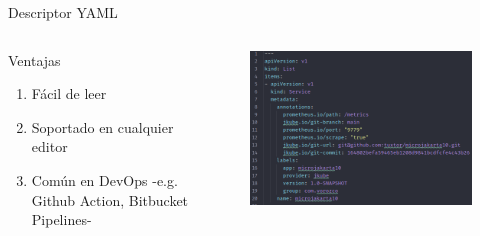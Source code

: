 \documentclass[aspectratio=169]{beamer}
\begin{document}
\begin{frame}{Descriptor YAML}
	\begin{columns}[T] %
		
		\begin{column}[T]{4cm} %
        Ventajas
		\begin{enumerate}
			\item Fácil de leer
			\item Soportado en cualquier editor
            \item Común en DevOps -e.g. Github Action, Bitbucket Pipelines-
		\end{enumerate}
		\end{column}
		\begin{column}[T]{6cm} %
			\begin{figure}
            \centering
            \includegraphics[width=\linewidth]{Images/yaml}
            \end{figure}
			
		\end{column}
	\end{columns}
\end{frame}
\end{document}
